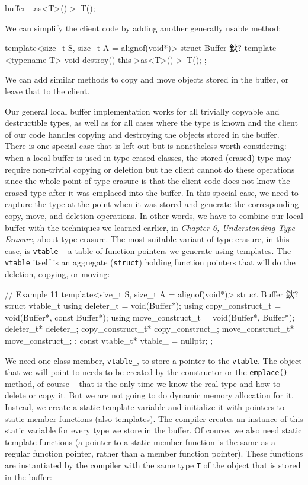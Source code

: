 \begin{code}
buffer_.as<T>()->~T();
\end{code}

We can simplify the client code by adding another generally usable method:

\begin{code}
template<size_t S, size_t A = alignof(void*)>
struct Buffer {
  鈥?
  template <typename T> void destroy() {
    this->as<T>()->~T();
  }
};
\end{code}

We can add similar methods to copy and move objects stored in the buffer, or leave that to the client.

Our general local buffer implementation works for all trivially copyable and destructible types, as well as for all cases where the type is known and the client of our code handles copying and destroying the objects stored in the buffer. There is one special case that is left out but is nonetheless worth considering: when a local buffer is used in type-erased classes, the stored (erased) type may require non-trivial copying or deletion but the client cannot do these operations since the whole point of type erasure is that the client code does not know the erased type after it was emplaced into the buffer. In this special case, we need to capture the type at the point when it was stored and generate the corresponding copy, move, and deletion operations. In other words, we have to combine our local buffer with the techniques we learned earlier, in \emph{Chapter 6, Understanding Type Erasure}, about type erasure. The most suitable variant of type erasure, in this case, is \texttt{vtable} -- a table of function pointers we generate using templates. The \texttt{vtable} itself is an aggregate (\texttt{struct}) holding function pointers that will do the deletion, copying, or moving:

\begin{code}
// Example 11
template<size_t S, size_t A = alignof(void*)>
struct Buffer {
  鈥?
  struct vtable_t {
    using deleter_t = void(Buffer*);
    using copy_construct_t = void(Buffer*, const Buffer*);
    using move_construct_t = void(Buffer*, Buffer*);
    deleter_t*  deleter_;
    copy_construct_t* copy_construct_;
    move_construct_t* move_construct_;
  };
  const vtable_t* vtable_ = nullptr;
};
\end{code}

We need one class member, \texttt{vtable\_}, to store a pointer to the \texttt{vtable}. The object that we will point to needs to be created by the constructor or the \texttt{emplace()} method, of course -- that is the only time we know the real type and how to delete or copy it. But we are not going to do dynamic memory allocation for it. Instead, we create a static template variable and initialize it with pointers to static member functions (also templates). The compiler creates an instance of this static variable for every type we store in the buffer. Of course, we also need static template functions (a pointer to a static member function is the same as a regular function pointer, rather than a member function pointer). These functions are instantiated by the compiler with the same type \texttt{T} of the object that is stored in the buffer:

